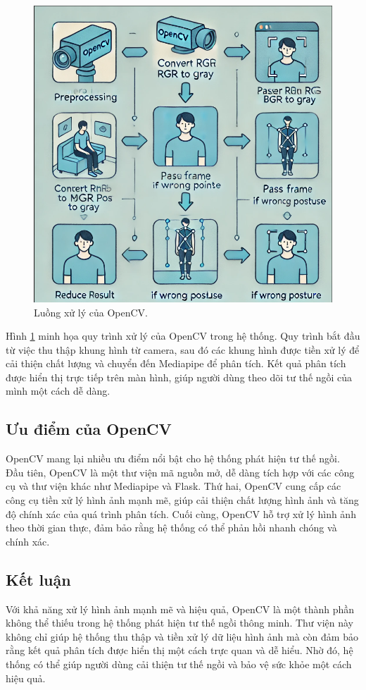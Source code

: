 \documentclass[conference]{IEEEtran}
\begin{document}
\begin{figure}[H]
    \centering
    \includegraphics[width=0.9\linewidth]{images/opencv_workflow.png}
    \caption{Luồng xử lý của OpenCV.}
    \label{fig:opencv_workflow}
\end{figure}

Hình \ref{fig:opencv_workflow} minh họa quy trình xử lý của OpenCV trong hệ thống. Quy trình bắt đầu từ việc thu thập khung hình từ camera, sau đó các khung hình được tiền xử lý để cải thiện chất lượng và chuyển đến Mediapipe để phân tích. Kết quả phân tích được hiển thị trực tiếp trên màn hình, giúp người dùng theo dõi tư thế ngồi của mình một cách dễ dàng.

\subsection{Ưu điểm của OpenCV}
OpenCV mang lại nhiều ưu điểm nổi bật cho hệ thống phát hiện tư thế ngồi. Đầu tiên, OpenCV là một thư viện mã nguồn mở, dễ dàng tích hợp với các công cụ và thư viện khác như Mediapipe và Flask. Thứ hai, OpenCV cung cấp các công cụ tiền xử lý hình ảnh mạnh mẽ, giúp cải thiện chất lượng hình ảnh và tăng độ chính xác của quá trình phân tích. Cuối cùng, OpenCV hỗ trợ xử lý hình ảnh theo thời gian thực, đảm bảo rằng hệ thống có thể phản hồi nhanh chóng và chính xác.

\subsection{Kết luận}
Với khả năng xử lý hình ảnh mạnh mẽ và hiệu quả, OpenCV là một thành phần không thể thiếu trong hệ thống phát hiện tư thế ngồi thông minh. Thư viện này không chỉ giúp hệ thống thu thập và tiền xử lý dữ liệu hình ảnh mà còn đảm bảo rằng kết quả phân tích được hiển thị một cách trực quan và dễ hiểu. Nhờ đó, hệ thống có thể giúp người dùng cải thiện tư thế ngồi và bảo vệ sức khỏe một cách hiệu quả.
\end{document}
